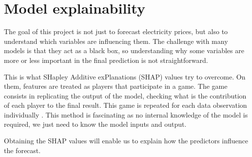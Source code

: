 \section{Model explainability}
%

The goal of this project is not just to forecast electricity prices, but also to understand which variables are influencing them. The challenge with many models is that they act as a black box, so understanding why some variables are more or less important in the final prediction is not straightforward.

This is what SHapley Additive exPlanations (SHAP) \cite{lundberg2017unified} values try to overcome. On them, features are treated as players that participate in a game. The game consists in replicating the output of the model, checking what is the contribution of each player to the final result. This game is repeated for each data observation individually \cite{shap-simplified}. This method is fascinating as no internal knowledge of the model is required, we just need to know the model inputs and output.

Obtaining the SHAP values will enable us to explain how the predictors influence the forecast.



